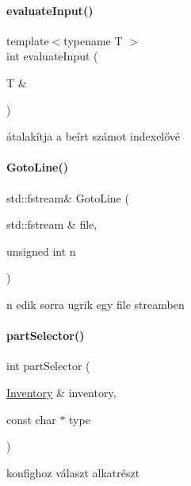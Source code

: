 \paragraph{\texorpdfstring{evaluateInput()}{evaluateInput()}}
{\footnotesize\ttfamily template$<$typename T $>$ \\
int evaluate\+Input (\begin{DoxyParamCaption}\item[{T \&}]{ }\end{DoxyParamCaption})}



átalakítja a beírt számot indexelővé 

\mbox{\label{_menu_8h_aac067d016b66218b6d8e0578bc214ef0}} 
\paragraph{\texorpdfstring{GotoLine()}{GotoLine()}}
{\footnotesize\ttfamily std\+::fstream\& Goto\+Line (\begin{DoxyParamCaption}\item[{std\+::fstream \&}]{file,  }\item[{unsigned int}]{n }\end{DoxyParamCaption})\hspace{0.3cm}{\ttfamily [inline]}}



n edik sorra ugrik egy file streamben 

\mbox{\label{_menu_8h_aa66bedcbb6a6b03cde60b3441e6ae031}} 
\paragraph{\texorpdfstring{partSelector()}{partSelector()}}
{\footnotesize\ttfamily int part\+Selector (\begin{DoxyParamCaption}\item[{\mbox{\hyperlink{class_inventory}{Inventory}} \&}]{inventory,  }\item[{const char $\ast$}]{type }\end{DoxyParamCaption})}



konfighoz választ alkatrészt 

\mbox{\label{_menu_8h_aa8348016f7273e63d47917126e8f9c69}} 
